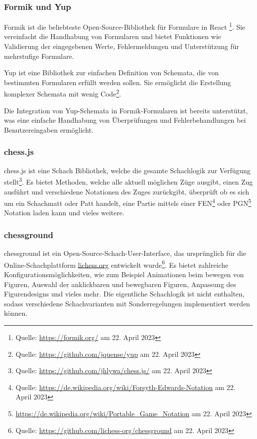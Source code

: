         \subsubsection{Formik und Yup}
        \label{sec:formik}
Formik ist die beliebteste Open-Source-Bibliothek für Formulare in React \footnote{Quelle: \url{https://formik.org/} am 22. April 2023}. Sie vereinfacht die Handhabung von Formularen und bietet Funktionen wie Validierung der eingegebenen Werte, Fehlermeldungen und Unterstützung für mehrstufige Formulare.

Yup ist eine Bibliothek  zur einfachen Definition von Schemata, die von bestimmten Formularen erfüllt werden sollen. Sie ermöglicht die Erstellung komplexer Schemata mit wenig Code\footnote{Quelle: \url{https://github.com/jquense/yup} am 22. April 2023}.

Die Integration von Yup-Schemata in Formik-Formularen ist bereits unterstützt, was eine einfache Handhabung von Überprüfungen und Fehlerbehandlungen bei Benutzereingaben ermöglicht.

        \subsubsection{chess.js}
        \label{sec:chess.js}
chess.js ist eine Schach Bibliothek, welche die gesamte Schachlogik zur Verfügung stellt\footnote{Quelle: \url{https://github.com/jhlywa/chess.js/} am 22. April 2023}. Es bietet Methoden, welche alle aktuell möglichen Züge ausgibt, einen Zug ausführt und verschiedene Notationen des Zuges zurückgibt, überprüft ob es sich um ein Schachmatt oder Patt handelt, eine Partie mittels einer FEN\footnote{Quelle: \url{https://de.wikipedia.org/wiki/Forsyth-Edwards-Notation} am 22. April 2023} oder PGN\footnote{\url{https://de.wikipedia.org/wiki/Portable_Game_Notation} am 22. April 2023} Notation laden kann und vieles weitere. 
        \subsubsection{chessground}
        \label{sec:chessground}
chessground ist ein Open-Source-Schach-User-Interface, das ursprünglich für die Online-Schachplattform \url{lichess.org} entwickelt wurde\footnote{Quelle: \url{https://github.com/lichess-org/chessground} am 22. April 2023}. Es bietet zahlreiche Konfigurationsmöglichkeiten, wie zum Beispiel Animationen beim bewegen von Figuren, Auswahl der anklickbaren und bewegbaren Figuren, Anpassung des Figurendesigns und vieles mehr. Die eigentliche Schachlogik ist nicht enthalten, sodass verschiedene Schachvarianten mit Sonderregelungen implementiert werden können.


